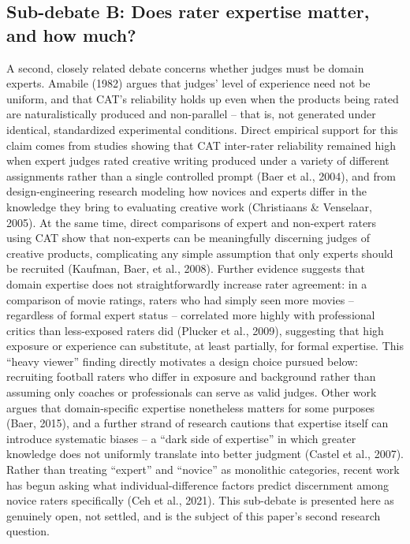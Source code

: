 \documentclass[
  12pt,
]{article}
\begin{document}
\subsection{Sub-debate B: Does rater expertise matter, and how
much?}\label{sub-debate-b-does-rater-expertise-matter-and-how-much}

A second, closely related debate concerns whether judges must be domain
experts. Amabile (1982) argues that judges' level of experience need not
be uniform, and that CAT's reliability holds up even when the products
being rated are naturalistically produced and non-parallel -- that is,
not generated under identical, standardized experimental conditions.
Direct empirical support for this claim comes from studies showing that
CAT inter-rater reliability remained high when expert judges rated
creative writing produced under a variety of different assignments
rather than a single controlled prompt (Baer et al., 2004), and from
design-engineering research modeling how novices and experts differ in
the knowledge they bring to evaluating creative work (Christiaans \&
Venselaar, 2005). At the same time, direct comparisons of expert and
non-expert raters using CAT show that non-experts can be meaningfully
discerning judges of creative products, complicating any simple
assumption that only experts should be recruited (Kaufman, Baer, et al.,
2008). Further evidence suggests that domain expertise does not
straightforwardly increase rater agreement: in a comparison of movie
ratings, raters who had simply seen more movies -- regardless of formal
expert status -- correlated more highly with professional critics than
less-exposed raters did (Plucker et al., 2009), suggesting that high
exposure or experience can substitute, at least partially, for formal
expertise. This ``heavy viewer'' finding directly motivates a design
choice pursued below: recruiting football raters who differ in exposure
and background rather than assuming only coaches or professionals can
serve as valid judges. Other work argues that domain-specific expertise
nonetheless matters for some purposes (Baer, 2015), and a further strand
of research cautions that expertise itself can introduce systematic
biases -- a ``dark side of expertise'' in which greater knowledge does
not uniformly translate into better judgment (Castel et al., 2007).
Rather than treating ``expert'' and ``novice'' as monolithic categories,
recent work has begun asking what individual-difference factors predict
discernment among novice raters specifically (Ceh et al., 2021). This
sub-debate is presented here as genuinely open, not settled, and is the
subject of this paper's second research question.
\end{document}
